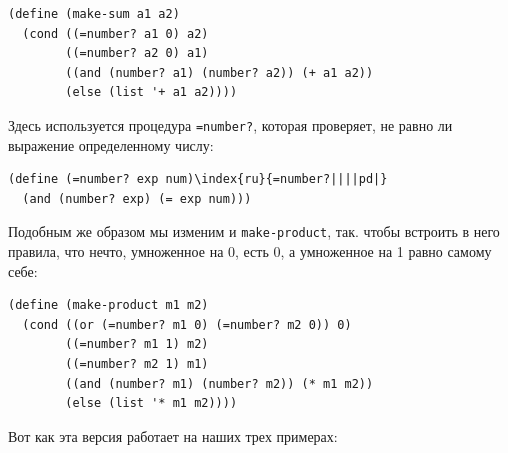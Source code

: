 \begin{Verbatim}[fontsize=\small]
(define (make-sum a1 a2)
  (cond ((=number? a1 0) a2)
        ((=number? a2 0) a1)
        ((and (number? a1) (number? a2)) (+ a1 a2))
        (else (list '+ a1 a2))))
\end{Verbatim}
Здесь используется процедура {\tt =number?}, которая проверяет, 
не равно ли выражение определенному числу:

\begin{Verbatim}[fontsize=\small]
(define (=number? exp num)\index{ru}{=number?||||pd|}
  (and (number? exp) (= exp num)))
\end{Verbatim}
Подобным же образом мы изменим и {\tt make-product}, так. чтобы 
встроить в него правила, что нечто, умноженное на 0, есть 0, а
умноженное на 1 равно самому себе:

\begin{Verbatim}[fontsize=\small]
(define (make-product m1 m2)
  (cond ((or (=number? m1 0) (=number? m2 0)) 0)
        ((=number? m1 1) m2)
        ((=number? m2 1) m1)
        ((and (number? m1) (number? m2)) (* m1 m2))
        (else (list '* m1 m2))))
\end{Verbatim}
Вот как эта версия работает на наших трех примерах:


